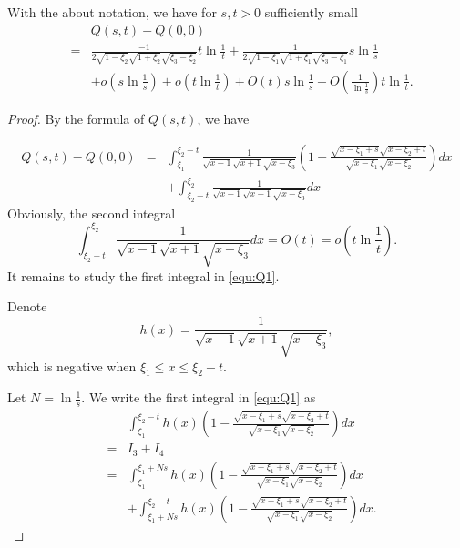 \documentclass[10pt,a4paper]{amsart}
\begin{document}
\begin{Proposition}\label{prop:Q}
    With the about notation, we have for $s,t>0$ sufficiently small
\begin{eqnarray*}
 && Q(s,t)-Q(0,0) \\
 &=& \frac{-1}{2\sqrt{1-\xi_2}\sqrt{1+\xi_2}\sqrt{\xi_3-\xi_2}} t \ln \frac{1}{t}+\frac{1}{2\sqrt{1-\xi_1}\sqrt{1+\xi_1}\sqrt{\xi_3-\xi_1}} s\ln \frac{1}{s}\\
  &&+o\left(s\ln \frac{1}{s}\right)+o\left(t\ln \frac{1}{t}\right)+  O(t)s\ln \frac{1}{s} + O\left(\frac{1}{\ln \frac{1}{s}}\right) t \ln \frac{1}{t}.
\end{eqnarray*}
\end{Proposition}

\begin{proof} By the formula of $Q(s,t)$, we have 

\begin{eqnarray}\label{equ:Q1}
Q(s,t)-Q(0,0)&=&\int_{\xi_1}^{\xi_2-t}\frac{1}{\sqrt{x-1}\sqrt{x+1}\sqrt{x-\xi_3}}
\left(1-\frac{\sqrt{x-\xi_1+s}\sqrt{x-\xi_2+t}}{\sqrt{x-\xi_1}\sqrt{x-\xi_2}}\right)dx  \nonumber \\ 
&& +\int_{\xi_2-t}^{\xi_2}\frac{1}{\sqrt{x-1}\sqrt{x+1}\sqrt{x-\xi_3}}dx
\end{eqnarray}
Obviously, the second integral
 $$\int_{\xi_2-t}^{\xi_2}\frac{1}{\sqrt{x-1}\sqrt{x+1}\sqrt{x-\xi_3}}dx=O(t)=o\left(t \ln \frac{1}{t}\right).$$ 
It remains to study the first integral in \eqref{equ:Q1}.
 

 
Denote $$h(x)=\frac{1}{\sqrt{x-1}\sqrt{x+1}\sqrt{x-\xi_3}},$$ 
which is negative when $\xi_1\leq x\leq \xi_2-t$. 


Let $N=\ln \frac{1}{s}$. We write the first integral in \eqref{equ:Q1} as
\begin{eqnarray}\label{equ:Q2}
 && \int_{\xi_1}^{\xi_2-t} h(x) \left(1-\frac{\sqrt{x-\xi_1+s}\sqrt{x-\xi_2+t}}{\sqrt{x-\xi_1}\sqrt{x-\xi_2}}\right)dx  \\
&=&  I_3+I_4 \nonumber \\
&=& \int_{\xi_1}^{\xi_1+Ns} h(x)\left(1-\frac{\sqrt{x-\xi_1+s}\sqrt{x-\xi_2+t}}{\sqrt{x-\xi_1}\sqrt{x-\xi_2}}\right)dx \nonumber \\ &&+\int_{\xi_1+Ns}^{\xi_2-t} h(x)\left(1-\frac{\sqrt{x-\xi_1+s}\sqrt{x-\xi_2+t}}{\sqrt{x-\xi_1}\sqrt{x-\xi_2}}\right)dx. \nonumber
\end{eqnarray}


\end{proof}
\end{document}
